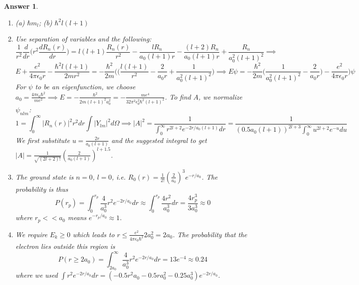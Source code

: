 \documentclass[a4paper]{article}
\newtheorem{ans}{Answer}[subsection]
\theoremstyle{new}
\begin{document}
\begin{ans}\leavevmode
\begin{enumerate}[label=(\roman*)]
\item (a) $\hbar m_l$; (b) $\hbar^2l(l+1)$
\item Use separation of variables and the following:
$$\frac{1}{r^2}\frac{d}{dr}\bigg(r^2\frac{dR_n(r)}{dr}\bigg)=l(l+1)\frac{R_n(r)}{r^2}-\frac{lR_n}{a_0(l+1)r}-\frac{(l+2)R_n}{a_0(l+1)r}+\frac{R_n}{a_0^2(l+1)^2}\implies$$
$$E+\frac{e^2}{4\pi\epsilon_0r}-\frac{\hbar^2l(l+1)}{2mr^2}=-\frac{\hbar^2}{2m}\bigg(\bigg(\frac{l(l+1)}{r^2}-\frac{2}{a_0r}+\frac{1}{a_0^2(l+1)^2}\bigg)\implies E\psi=-\frac{\hbar^2}{2m}\bigg(\frac{1}{a_0^2(l+1)^2}-\frac{2}{a_0r}\bigg)-\frac{e^2}{4\pi\epsilon_0r}\bigg)\psi$$
For $\psi$ to be an eigenfunction, we choose $a_0=\frac{4\pi\epsilon_0\hbar^2}{me^2}\implies E=-\frac{\hbar^2}{2m(l+1)^2a_0^2}=-\frac{me^4}{32\pi^2\epsilon_0^2\hbar^2(l+1)^2}$. To find $A$, we normalize $\psi_{nlm}$:
$$1=\int_0^\infty |R_n(r)|^2r^2dr\int|Y_{lm}|^2d\Omega\implies|A|^2=\frac{1}{\int_0^\infty r^{2l+2}e^{-2r/a_0(l+1)}dr}=\frac{1}{(0.5a_0(l+1))^{2l+3}\int_0^\infty u^{2l+2}e^{-u}du}$$
We first substitute $u=\frac{2r}{a_0(l+1)}$ and the suggested integral to get $|A|=\frac{1}{\sqrt{(2l+2)!}}(\frac{2}{a_0(l+1)})^{l+1.5}$.
\item The ground state is $n=0$, $l=0$, i.e. $R_0(r)=\frac{1}{2!}(\frac{2}{a_0})^3e^{-r/a_0}$. The probability is thus
$$P(r_p)=\int_0^{r_p}\frac{4}{a_0^3}r^2e^{-2r/a_0}dr\approx\int_0^{r_p}\frac{4r^2}{a_0^3}dr=\frac{4r_p^3}{3a_0^3}\approx 0$$
where $r_p<<a_0$ means $e^{-r_p/a_0}\approx 1$.
\item We require $E_k\geq0$ which leads to $r\leq\frac{e^2}{4\pi\epsilon_0\hbar^2}2a_0^2=2a_0$. The probability that the electron lies outside this region is
$$P(r\geq2a_0)=\int_{2a_0}^\infty\frac{4}{a_0^3}r^2e^{-2r/a_0}dr=13e^{-4}\approx 0.24$$
where we used $\int r^2e^{-2r/a_0}dr=(-0.5r^2a_0-0.5ra_0^2-0.25a_0^3)e^{-2r/a_0}$.
\end{enumerate}
\end{ans}
\newpage
\end{document}

